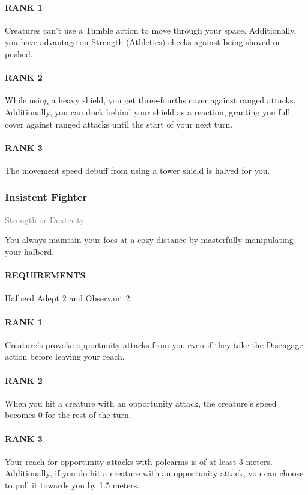 \paragraph{RANK 1} Creatures can't use a Tumble action to move through your space.
Additionally, you have advantage on Strength (Athletics) checks against being shoved or pushed.
\paragraph{RANK 2} While using a heavy shield, you get three-fourths cover against ranged attacks.
Additionally, you can duck behind your shield as a reaction, granting you full cover against ranged attacks until the start of your next turn.
\paragraph{RANK 3} The movement speed debuff from using a tower shield is halved for you.

\subsubsection{Insistent Fighter} \label{feat::insistentfighter}
\small{\textcolor{gray}{Strength or Dexterity}}

\normalsize
You always maintain your foes at a cozy distance by masterfully manipulating your halberd.
\paragraph{REQUIREMENTS} Halberd Adept 2 and Observant 2.
\paragraph{RANK 1} Creature's provoke opportunity attacks from you even if they take the Disengage action before leaving your reach.
\paragraph{RANK 2} When you hit a creature with an opportunity attack, the creature's speed becomes 0 for the rest of the turn.
\paragraph{RANK 3} Your reach for opportunity attacks with polearms is of at least 3 meters.
Additionally, if you do hit a creature with an opportunity attack, you can choose to pull it towards you by 1.5 meters.

